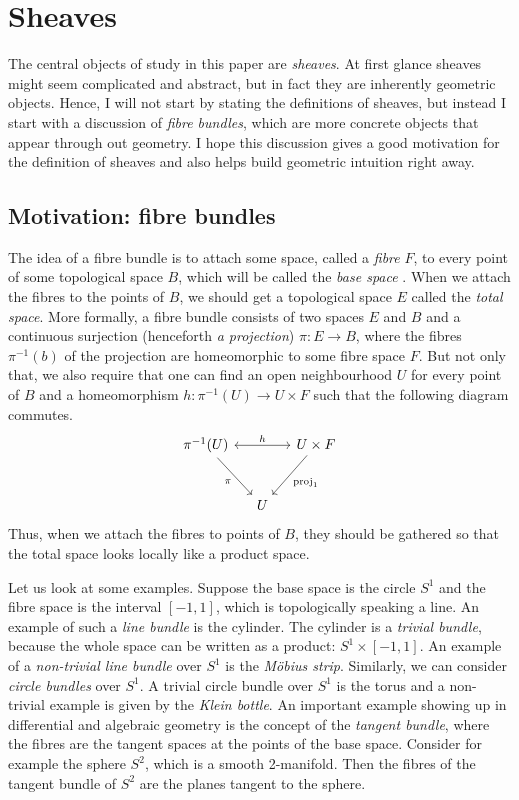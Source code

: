 \section{Sheaves}
The central objects of study in this paper are \emph{sheaves}. At first
glance sheaves might seem complicated and abstract, but in fact they are
inherently geometric objects. Hence, I will not start by stating the
definitions of sheaves, but instead I start with a discussion of
\emph{fibre bundles}, which are more concrete objects that appear through
out geometry. I hope this discussion gives a good motivation for
the definition of sheaves and also helps build geometric intuition right
away.

\subsection{Motivation: fibre bundles}
The idea of a fibre bundle is to attach some space, called a \emph{fibre}
$F$, to every point of some topological space $B$, which will be called
the \emph{base space} \cite{hatcher}. When we attach the fibres to the
points of $B$, we should get a topological space $E$ called the
\emph{total space}. More formally, a fibre bundle consists of two spaces $E$
and $B$ and a continuous surjection (henceforth \emph{a projection})
$\pi:E\to B$, where the fibres $\pi^{-1}(b)$ of the projection are
homeomorphic to some fibre space $F$. But not only that, we also require
that one can find an open neighbourhood $U$ for every point of $B$ and a
homeomorphism $h:\pi^{-1}(U)\to U\times F$ such that the following diagram
commutes.
\[\begin{tikzcd}[row sep=large, column sep=small]
    {\pi^{-1}(U)} && {U\times F} \\
    & U
    \arrow["\pi"', from=1-1, to=2-2]
    \arrow["{\text{proj}_1}", from=1-3, to=2-2]
    \arrow["h", leftrightarrow, from=1-1, to=1-3]
  \end{tikzcd}\]
Thus, when we attach the fibres to points of $B$, they should be gathered
so that the total space looks locally like a product space.

Let us look at some examples. Suppose the base space is the circle $S^{1}$
and the fibre space is the interval $[-1, 1]$, which is topologically
speaking a line. An example of such a \emph{line bundle} is the cylinder.
The cylinder is a \emph{trivial bundle}, because the whole space can
be written as a product: $S^{1}\times [-1,1]$. An example of a
\emph{non-trivial line bundle} over $S^{1}$ is the \emph{Möbius strip}.
Similarly, we can consider \emph{circle bundles} over $S^{1}$. A trivial
circle bundle over $S^{1}$ is the torus and a non-trivial example is given
by the \emph{Klein bottle}.
An important example showing up in differential and algebraic geometry
is the concept of the \emph{tangent bundle}, where the fibres are the
tangent spaces at the points of the base space. Consider for example the
sphere $S^{2}$, which is a smooth 2-manifold. Then the fibres of the tangent
bundle of $S^{2}$ are the planes tangent to the sphere.

